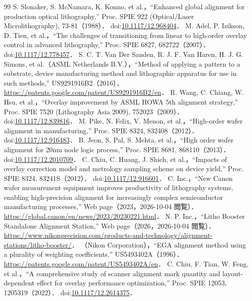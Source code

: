 \begin{thebibliography}{99}
\small
{} S. Slonaker, S. McNamara, K. Konno, et al.，``Enhanced global alignment for production optical lithography,'' Proc. SPIE 922 (Optical/Laser Microlithography), 73-81（1988）． doi:\href{https://doi.org/10.1117/12.968404}{10.1117/12.968404}．
 M. Adel, P. Izikson, D. Tien, et al.，``The challenges of transitioning from linear to high-order overlay control in advanced lithography,'' Proc. SPIE 6827, 682722（2007）． doi:\href{https://doi.org/10.1117/12.778457}{10.1117/12.778457}．
 S. C. T. Van Der Sanden, R. J. F. Van Haren, H. J. G. Simons, et al.（ASML Netherlands B.V.），``Method of applying a pattern to a substrate, device manufacturing method and lithographic apparatus for use in such methods,'' US9291916B2（2016）． \url{https://patents.google.com/patent/US9291916B2/en}．
 R. Wang, C. Chiang, W. Hsu, et al.，``Overlay improvement by ASML HOWA 5th alignment strategy,'' Proc. SPIE 7520 (Lithography Asia 2009), 752023（2009）． doi:\href{https://doi.org/10.1117/12.839816}{10.1117/12.839816}．
 M. Pike, N. Felix, V. Menon, et al.，``High-order wafer alignment in manufacturing,'' Proc. SPIE 8324, 832408（2012）． doi:\href{https://doi.org/10.1117/12.916483}{10.1117/12.916483}．
 B. Jeon, S. Pal, S. Mehta, et al.，``High order wafer alignment for 20nm node logic process,'' Proc. SPIE 8681, 868110（2013）． doi:\href{https://doi.org/10.1117/12.2010709}{10.1117/12.2010709}．
 C. Chiu, C. Huang, J. Shieh, et al.，``Impacts of overlay correction model and metrology sampling scheme on device yield,'' Proc. SPIE 8324, 83241S（2012）． doi:\href{https://doi.org/10.1117/12.916601}{10.1117/12.916601}．
 C. Inc.，``New Canon wafer measurement equipment improves productivity of lithography systems, enabling high-precision alignment for increasingly complex semiconductor manufacturing processes,'' Web page（2023，2026-10-04 閲覧）． \url{https://global.canon/en/news/2023/20230221.html}．
 N. P. Inc.，``Litho Booster Standalone Alignment Station,'' Web page（2026，2026-10-04 閲覧）． \url{https://www.nikonprecision.com/products-and-technology/alignment-stations/litho-booster/}．
 （Nikon Corporation），``EGA alignment method using a plurality of weighting coefficients,'' US5493402A（1996）． \url{https://patents.google.com/patent/US5493402A/en}．
 C. Chiu, F. Tian, W. Feng, et al.，``A comprehensive study of scanner alignment mark quantity and layout-dependent effect for overlay performance optimization,'' Proc. SPIE 12053, 1205319（2022）． doi:\href{https://doi.org/10.1117/12.2614375}{10.1117/12.2614375}．

\end{thebibliography}
